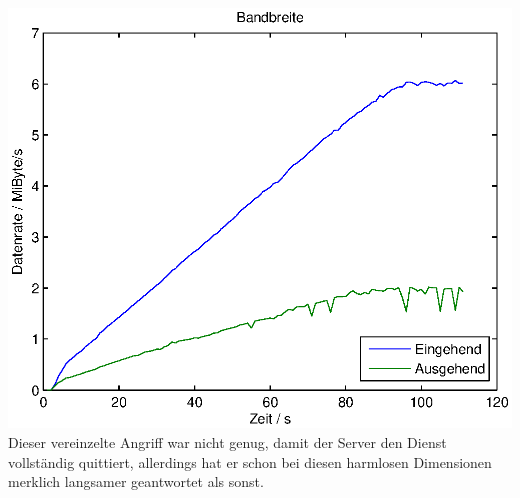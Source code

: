 \documentclass[12pt,a4paper]{article}
\begin{document}
\includegraphics[scale=0.9]{MatLab/LOICVictimBand.eps}\\
Dieser vereinzelte Angriff war nicht genug, damit der Server den Dienst vollständig quittiert, allerdings hat er schon bei diesen harmlosen Dimensionen merklich langsamer geantwortet als sonst.
\end{document}
